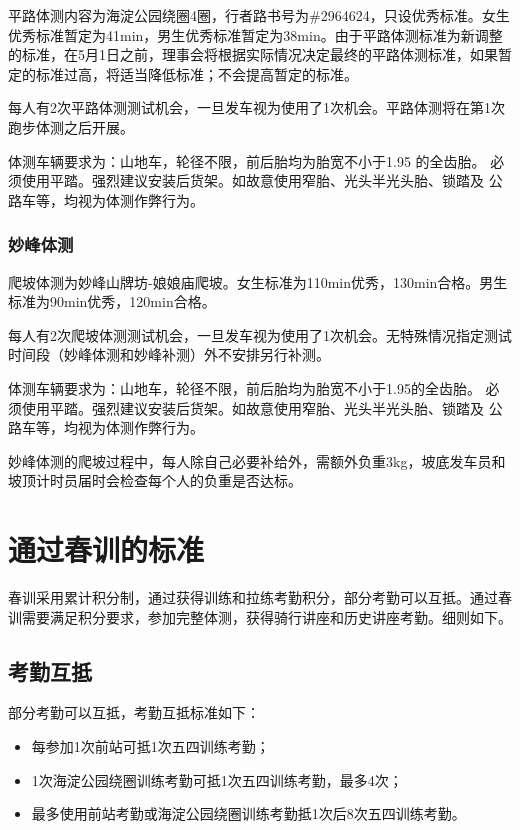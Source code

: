\documentclass[UTF8]{ctexart}
\begin{document}
平路体测内容为海淀公园绕圈4圈，行者路书号为\#2964624，只设优秀标准。女生优秀标准暂定为41min，男生优秀标准暂定为38min。由于平路体测标准为新调整的标准，在5月1日之前，理事会将根据实际情况决定最终的平路体测标准，如果暂定的标准过高，将适当降低标准；不会提高暂定的标准。

每人有2次平路体测测试机会，一旦发车视为使用了1次机会。平路体测将在第1次跑步体测之后开展。

体测车辆要求为：山地车，轮径不限，前后胎均为胎宽不小于1.95 的全齿胎。
必须使用平踏。强烈建议安装后货架。如故意使用窄胎、光头半光头胎、锁踏及
公路车等，均视为体测作弊行为。

\subsubsection{妙峰体测}

爬坡体测为妙峰山牌坊-娘娘庙爬坡。女生标准为110min优秀，130min合格。男生标准为90min优秀，120min合格。

每人有2次爬坡体测测试机会，一旦发车视为使用了1次机会。无特殊情况指定测试时间段（妙峰体测和妙峰补测）外不安排另行补测。

体测车辆要求为：山地车，轮径不限，前后胎均为胎宽不小于1.95的全齿胎。
必须使用平踏。强烈建议安装后货架。如故意使用窄胎、光头半光头胎、锁踏及
公路车等，均视为体测作弊行为。

妙峰体测的爬坡过程中，每人除自己必要补给外，需额外负重3kg，坡底发车员和坡顶计时员届时会检查每个人的负重是否达标。

\section{通过春训的标准}

春训采用累计积分制，通过获得训练和拉练考勤积分，部分考勤可以互抵。通过春训需要满足积分要求，参加完整体测，获得骑行讲座和历史讲座考勤。细则如下。

\subsection{考勤互抵}

部分考勤可以互抵，考勤互抵标准如下：

\begin{itemize}[nosep,left=4em]
    \item 每参加1次前站可抵1次五四训练考勤；
    \item 1次海淀公园绕圈训练考勤可抵1次五四训练考勤，最多4次；
    \item 最多使用前站考勤或海淀公园绕圈训练考勤抵1次后8次五四训练考勤。 
\end{itemize}
\end{document}

